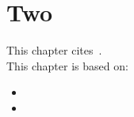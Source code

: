\chapter{Two}
This chapter cites~\cite{steiner_derive_2011,steiner_ijcisim_2013}.
\\[\baselineskip]

\noindent
This chapter is based on:
\begin{itemize}
  \item {}
  \item {}
\end{itemize}

\printbibliography[heading=subbibliography,notcategory=onlyfullcite]

